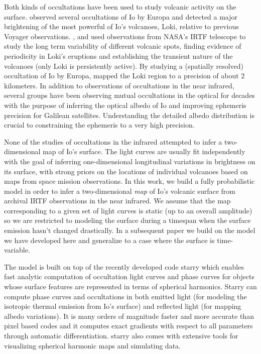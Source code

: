 \documentclass[modern]{aastex62}
\begin{document}
Both kinds of occultations have been used to study volcanic activity on the surface.
\cite{spencer1994} observed several occultations of Io by Europa and detected a major brightening of the most powerful of Io's volcanoes, Loki, relative to previous Voyager observations.
\cite{rathbun2002},\citet{rathbun2006} and \citet{rathbun2010} used observations from NASA's IRTF telescope to study the long term variability of different volcanic spots, finding evidence of periodicity in Loki's eruptions and establishing the transient nature of the volcanoes (only Loki is persistently active).
By studying a (spatially resolved) occultation of Io by Europa, \cite{dekleer2017} mapped the Loki region to a precision of about 2 kilometers.
In addition to observations of occultations in the near infrared, several groups have been observing mutual occultations in the optical \citep[][and references therein]{arlot1974,saquet2018,morgado2016a} for decades with the purpose of inferring the optical albedo of Io and improving ephemeris precision for Galilean satellites.
Understanding the detailed albedo distribution is crucial to constraining the ephemeris to a very high precision.

None of the studies of occultations in the infrared attempted to infer a two-dimensional map of Io's surface.
The light curves are usually fit independently with the goal of inferring one-dimensional longitudinal variations in brightness on its surface, with
strong priors on the locations of individual volcanoes based on maps from space mission observations.
In this work, we build a fully probabilistic model in order to infer a two-dimensional \emph{map} of Io's volcanic surface from archival IRTF observations in the near infrared.
We assume that the map corresponding to a given set of light curves is static (up to an overall amplitude) so we are restricted to modeling the surface during a timespan when the surface emission hasn't changed drastically.
In a subsequent paper we build on the model we have developed here and generalize to a case where the surface is time-variable.

The model is built on top of the recently developed code \textsf{starry}\citep[][Luger et al. 2021 in prep]{luger2019a} which enables fast analytic computation of occultation light curves and phase curves for objects whose surface features are represented in terms of spherical harmonics.
Starry can compute phase curves and occultations in both emitted light (for modeling the isotropic thermal emission from Io's surface) and reflected light (for mapping albedo variations).
It is many orders of magnitude faster and more accurate than pixel based codes and it computes exact gradients with respect to all parameters through automatic differentiation.
\textsf{starry} also comes with extensive tools for visualizing spherical harmonic maps and simulating data.
\end{document}
